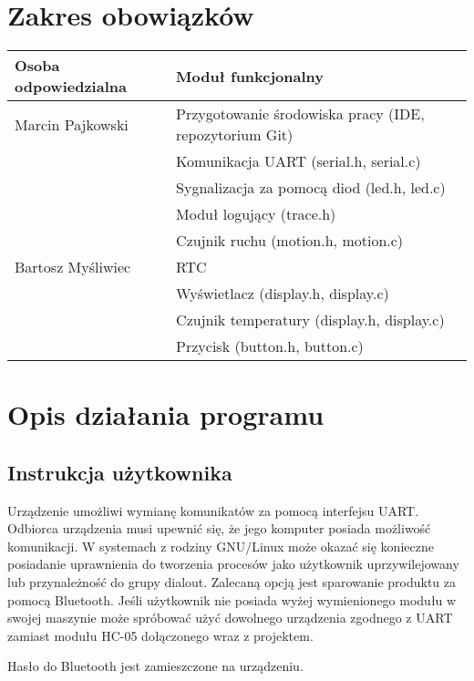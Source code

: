 \documentclass{article}
\begin{document}
\newpage
\section{Zakres obowiązków}

\begin{tabular}{|l|l|}
    \hline
    Osoba odpowiedzialna & Moduł funkcjonalny\\
    \hline
    Marcin Pajkowski
    & Przygotowanie środowiska pracy (IDE, repozytorium Git)\\
    & Komunikacja UART (serial.h, serial.c)\\
    & Sygnalizacja za pomocą diod (led.h, led.c)\\
    & Moduł logujący (trace.h)\\
    & Czujnik ruchu (motion.h, motion.c)\\
    \hline
    Bartosz Myśliwiec
    & RTC\\
    & Wyświetlacz (display.h, display.c)\\
    & Czujnik temperatury (display.h, display.c)\\
    & Przycisk (button.h, button.c)\\
    \hline
\end{tabular}


\section{Opis działania programu}
\subsection{Instrukcja użytkownika}

Urządzenie umożliwi wymianę komunikatów za pomocą interfejsu UART. Odbiorca urządzenia
musi upewnić się, że jego komputer posiada możliwość komunikacji. W systemach
z rodziny GNU/Linux może okazać się konieczne posiadanie uprawnienia do tworzenia
procesów jako użytkownik uprzywilejowany lub przynależność do grupy dialout. Zalecaną opcją
jest sparowanie produktu za pomocą Bluetooth. Jeśli użytkownik
nie posiada wyżej wymienionego modułu w swojej maszynie może spróbować użyć
dowolnego urządzenia zgodnego z UART zamiast modułu HC-05 dołączonego wraz z projektem.

Hasło do Bluetooth jest zamieszczone na urządzeniu.
\end{document}
